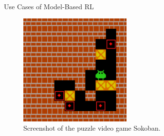 \begin{frame}{Use Cases of Model-Based RL}
    \begin{figure}
        \centering
        \includegraphics[width=0.5\textwidth]{assets/sokoban.png}
        \caption{Screenshot of the puzzle video game Sokoban. \cite{sokoban}}
        \label{fig:sokoban}
    \end{figure}
\end{frame}

